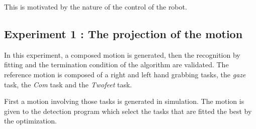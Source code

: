 \documentclass[letterpaper, 10pt, conference]{ieeeconf}      %
\begin{document}
This is motivated by the nature of the control of the
robot.\\

\subsection{Experiment 1 : The projection of the motion}
In this experiment, a composed motion is generated, then the recognition by fitting
and the termination condition of the algorithm are validated.
The reference motion is composed of a right and left hand grabbing tasks,
the \emph{gaze} task, the \emph{Com} task and the \emph{Twofeet} task.

First a motion involving those tasks is generated in simulation.
The motion is given to the detection program
which select the tasks that are fitted the best by the optimization.
\end{document}
